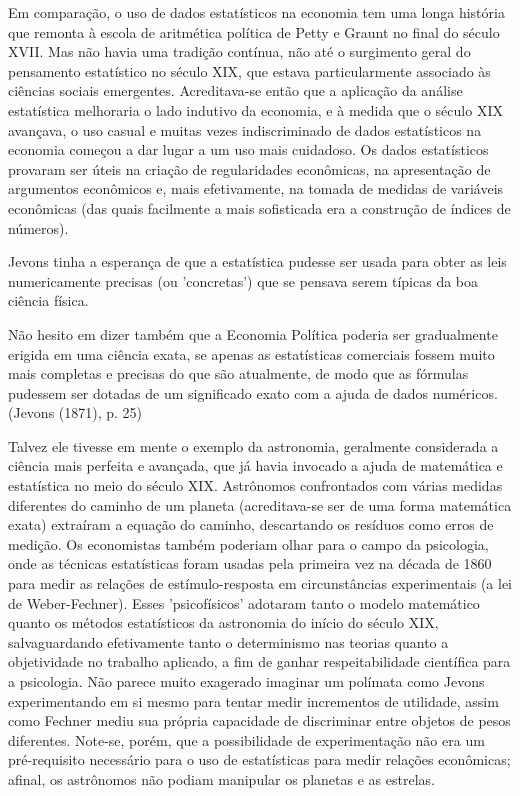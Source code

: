 \documentclass[12pt]{article}
\begin{document}
Em comparação, o uso de dados estatísticos na economia tem uma longa história que remonta à escola de aritmética política de Petty e Graunt no final do século XVII. Mas não havia uma tradição contínua, não até o surgimento geral do pensamento estatístico no século XIX, que estava particularmente associado às ciências sociais emergentes. Acreditava-se então que a aplicação da análise estatística melhoraria o lado indutivo da economia, e à medida que o século XIX avançava, o uso casual e muitas vezes indiscriminado de dados estatísticos na economia começou a dar lugar a um uso mais cuidadoso. Os dados estatísticos provaram ser úteis na criação de regularidades econômicas, na apresentação de argumentos econômicos e, mais efetivamente, na tomada de medidas de variáveis econômicas (das quais facilmente a mais sofisticada era a construção de índices de números).

Jevons tinha a esperança de que a estatística pudesse ser usada para obter as leis numericamente precisas (ou 'concretas') que se pensava serem típicas da boa ciência física.

Não hesito em dizer também que a Economia Política poderia ser gradualmente erigida em uma ciência exata, se apenas as estatísticas comerciais fossem muito mais completas e precisas do que são atualmente, de modo que as fórmulas pudessem ser dotadas de um significado exato com a ajuda de dados numéricos.
(Jevons (1871), p. 25)

Talvez ele tivesse em mente o exemplo da astronomia, geralmente considerada a ciência mais perfeita e avançada, que já havia invocado a ajuda de matemática e estatística no meio do século XIX. Astrônomos confrontados com várias medidas diferentes do caminho de um planeta (acreditava-se ser de uma forma matemática exata) extraíram a equação do caminho, descartando os resíduos como erros de medição. Os economistas também poderiam olhar para o campo da psicologia, onde as técnicas estatísticas foram usadas pela primeira vez na década de 1860 para medir as relações de estímulo-resposta em circunstâncias experimentais (a lei de Weber-Fechner). Esses 'psicofísicos' adotaram tanto o modelo matemático quanto os métodos estatísticos da astronomia do início do século XIX, salvaguardando efetivamente tanto o determinismo nas teorias quanto a objetividade no trabalho aplicado, a fim de ganhar respeitabilidade científica para a psicologia. Não parece muito exagerado imaginar um polímata como Jevons experimentando em si mesmo para tentar medir incrementos de utilidade, assim como Fechner mediu sua própria capacidade de discriminar entre objetos de pesos diferentes. Note-se, porém, que a possibilidade de experimentação não era um pré-requisito necessário para o uso de estatísticas para medir relações econômicas; afinal, os astrônomos não podiam manipular os planetas e as estrelas.
\end{document}
